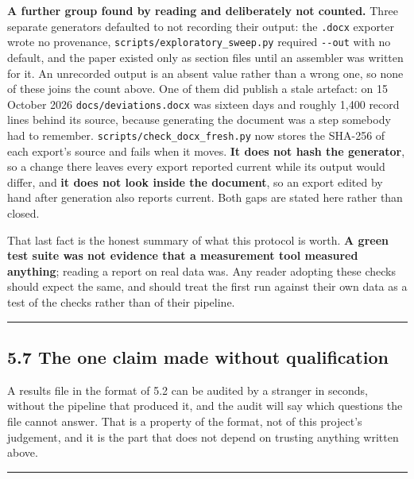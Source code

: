 \documentclass[
  10pt,
]{article}
\newcounter{none} %
\begin{document}
\textbf{A further group found by reading and deliberately not counted.}
Three separate generators defaulted to not recording their output: the
\texttt{.docx} exporter wrote no provenance,
\texttt{scripts/\allowbreak{}exploratory\_\allowbreak{}sweep.py} required \texttt{-\/-out} with no
default, and the paper existed only as section files until an assembler
was written for it. An unrecorded output is an absent value rather than
a wrong one, so none of these joins the count above. One of them did
publish a stale artefact: on 15 October 2026
\texttt{docs/\allowbreak{}deviations.docx} was sixteen days and roughly 1,400 record
lines behind its source, because generating the document was a step
somebody had to remember. \texttt{scripts/\allowbreak{}check\_\allowbreak{}docx\_\allowbreak{}fresh.py} now
stores the SHA-256 of each export's source and fails when it moves.
\textbf{It does not hash the generator}, so a change there leaves every
export reported current while its output would differ, and \textbf{it
does not look inside the document}, so an export edited by hand after
generation also reports current. Both gaps are stated here rather than
closed.

That last fact is the honest summary of what this protocol is worth.
\textbf{A green test suite was not evidence that a measurement tool
measured anything}; reading a report on real data was. Any reader
adopting these checks should expect the same, and should treat the first
run against their own data as a test of the checks rather than of their
pipeline.

\begin{center}\rule{0.5\linewidth}{0.5pt}\end{center}

\subsection{5.7 The one claim made without
qualification}\label{the-one-claim-made-without-qualification}

A results file in the format of 5.2 can be audited by a stranger in
seconds, without the pipeline that produced it, and the audit will say
which questions the file cannot answer. That is a property of the
format, not of this project's judgement, and it is the part that does
not depend on trusting anything written above.

\begin{center}\rule{0.5\linewidth}{0.5pt}\end{center}
\end{document}
